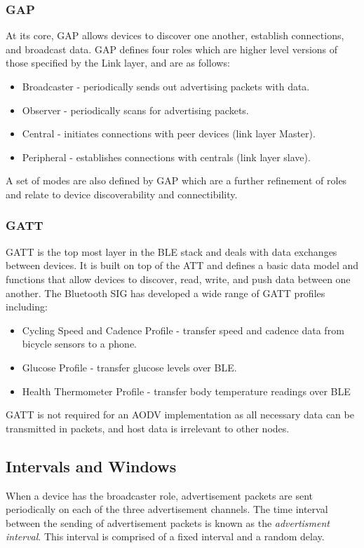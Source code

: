         \subsubsection{GAP}
    At its core, GAP allows devices to discover one another, establish connections,
    and broadcast data. GAP defines four roles which are higher level versions
    of those specified by the Link layer, and are as follows:
    \begin{itemize}
      \item Broadcaster - periodically sends out advertising packets with data.
      \item Observer - periodically scans for advertising packets.
      \item Central - initiates connections with peer devices (link layer Master).
      \item Peripheral - establishes connections with centrals (link layer slave).
    \end{itemize}
    A set of modes are also defined by GAP which are a further refinement of roles
    and relate to device discoverability and connectibility.

        \subsubsection{GATT}
    GATT is the top most layer in the BLE stack and deals with data exchanges between
    devices. It is built on top of the ATT and defines a basic data model and functions that allow devices to discover,
    read, write, and push data between one another. The Bluetooth SIG has developed
    a wide range of GATT profiles including:
    \begin{itemize}
      \item Cycling Speed and Cadence Profile - transfer speed and cadence data from
      bicycle sensors to a phone.
      \item Glucose Profile - transfer glucose levels over BLE.
      \item Health Thermometer Profile - transfer body temperature readings over BLE
    \end{itemize}
    GATT is not required for an AODV implementation as all necessary data can
    be transmitted in packets, and host data is irrelevant to other nodes.

      \subsection{Intervals and Windows}
    When a device has the broadcaster role, advertisement packets are sent
    periodically on each of the three advertisement channels. The time interval
    between the sending of advertisement packets is known as the \textit{advertisment
    interval}. This interval is comprised of a fixed interval and a random delay.

